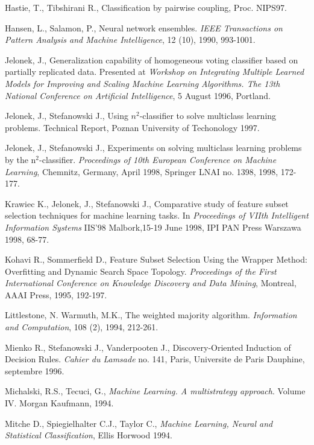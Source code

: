 \documentclass{article}
\begin{document}
\begin{thebibliography}{99}
  Hastie, T., Tibshirani R., Classification by pairwise
coupling, Proc. NIPS97.

  Hansen, L., Salamon, P., Neural network ensembles. {\em IEEE
Transactions on Pattern Analysis and Machine Intelligence}, 12
(10), 1990, 993-1001.

  Jelonek, J., Generalization capability of homogeneous
voting classifier based on partially replicated data. Presented at
{\em Workshop on Integrating Multiple Learned Models for Improving
and Scaling Machine Learning Algorithms. The 13th National
Conference on Artificial Intelligence}, 5 August 1996, Portland.

  Jelonek, J., Stefanowski J., Using $n^2$-classifier to
solve multiclass learning problems. Technical Report, Poznan University of
Techonology 1997.

  Jelonek, J., Stefanowski J., Experiments on solving
multiclass learning problems by the n$^2$-classifier. {\em
Proceedings of 10th European Conference on Machine Learning},
Chemnitz, Germany, April 1998, Springer LNAI no. 1398, 1998,
172-177.

  Krawiec K., Jelonek, J., Stefanowski J., Comparative
study of feature subset selection techniques for machine learning
tasks. In {\em Proceedings of VIIth Intelligent Information
Systems} IIS'98 Malbork,15-19 June 1998, IPI PAN Press Warszawa
1998, 68-77.

  Kohavi R., Sommerfield D., Feature Subset Selection Using
the Wrapper Method: Overfitting and Dynamic Search Space Topology.
{\em Proceedings of the First International Conference on
Knowledge Discovery and Data Mining}, Montreal, AAAI Press, 1995,
192-197.

  Littlestone, N. Warmuth, M.K., The weighted majority
algorithm. {\em Information and Computation}, 108 (2), 1994, 212-261.


  Mienko R., Stefanowski J., Vanderpooten J.,
Discovery-Oriented Induction of Decision Rules. {\em Cahier du Lamsade} no.
141, Paris, Universite de Paris Dauphine, septembre 1996.

  Michalski, R.S., Tecuci, G., {\em Machine Learning. A
multistrategy approach}. Volume IV. Morgan Kaufmann, 1994.

  Mitche D., Spiegielhalter C.J., Taylor C., {\em Machine
Learning, Neural and Statistical Classification}, Ellis Horwood 1994.


\end{thebibliography}
\end{document}
